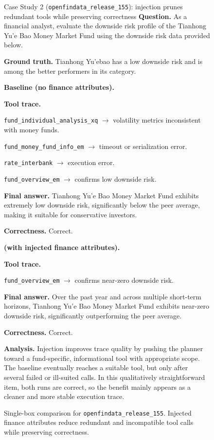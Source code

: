 \begin{figure}[htbp]
\begin{casecard}{Case Study 2 (\texttt{openfindata\_release\_155}): injection prunes redundant tools while preserving correctness}
\textbf{Question.} As a financial analyst, evaluate the downside risk profile of the Tianhong Yu'e Bao Money Market Fund using the downside risk data provided below.\par
\smallskip
\textbf{Ground truth.} Tianhong Yu'ebao has a low downside risk and is among the better performers in its category.\par
\medskip
\begin{minipage}[t]{0.49\textwidth}
\textbf{Baseline (no finance attributes).}\par
\textbf{Tool trace.}\par
\texttt{fund\_individual\_analysis\_xq} $\rightarrow$ volatility metrics inconsistent with money funds.\par
\texttt{fund\_money\_fund\_info\_em} $\rightarrow$ timeout or serialization error.\par
\texttt{rate\_interbank} $\rightarrow$ execution error.\par
\texttt{fund\_overview\_em} $\rightarrow$ confirms low downside risk.\par
\textbf{Final answer.} Tianhong Yu'e Bao Money Market Fund exhibits extremely low downside risk, significantly below the peer average, making it suitable for conservative investors.\par
\textbf{Correctness.} Correct.\par
\end{minipage}\hfill
\begin{minipage}[t]{0.49\textwidth}
\textbf{\methodname{} (with injected finance attributes).}\par
\textbf{Tool trace.}\par
\texttt{fund\_overview\_em} $\rightarrow$ confirms near-zero downside risk.\par
\textbf{Final answer.} Over the past year and across multiple short-term horizons, Tianhong Yu'e Bao Money Market Fund exhibits near-zero downside risk, significantly outperforming the peer average.\par
\textbf{Correctness.} Correct.\par
\end{minipage}
\medskip

\textbf{Analysis.} Injection improves trace quality by pushing the planner toward a fund-specific, informational tool with appropriate scope. The baseline eventually reaches a suitable tool, but only after several failed or ill-suited calls. In this qualitatively straightforward item, both runs are correct, so the benefit mainly appears as a cleaner and more stable execution trace.\par
\end{casecard}
\caption{Single-box comparison for \texttt{openfindata\_release\_155}. Injected finance attributes reduce redundant and incompatible tool calls while preserving correctness.}
\label{fig:case_study_openfindata_fund}
\end{figure}

